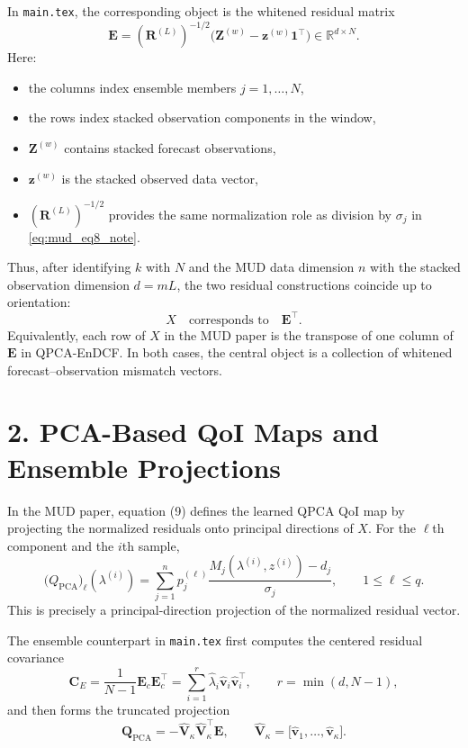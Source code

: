 \documentclass[11pt]{article}
\begin{document}
In \texttt{main.tex}, the corresponding object is the whitened residual matrix
\begin{equation}
\mathbf{E}
=
(\mathbf{R}^{(L)})^{-1/2}\bigl(\mathbf{Z}^{(w)} - \mathbf{z}^{(w)}\mathbf{1}^\top\bigr)
\in \mathbb{R}^{d \times N}.
\label{eq:endcf_residual_note}
\end{equation}
Here:
\begin{itemize}
\item the columns index ensemble members $j=1,\dots,N$,
\item the rows index stacked observation components in the window,
\item $\mathbf{Z}^{(w)}$ contains stacked forecast observations,
\item $\mathbf{z}^{(w)}$ is the stacked observed data vector,
\item $(\mathbf{R}^{(L)})^{-1/2}$ provides the same normalization role as division by $\sigma_j$ in \eqref{eq:mud_eq8_note}.
\end{itemize}

Thus, after identifying $k$ with $N$ and the MUD data dimension $n$ with the stacked observation dimension $d=mL$, the two residual constructions coincide up to orientation:
\begin{equation}
X \quad \text{corresponds to} \quad \mathbf{E}^\top.
\end{equation}
Equivalently, each row of $X$ in the MUD paper is the transpose of one column of $\mathbf{E}$ in QPCA-EnDCF. In both cases, the central object is a collection of whitened forecast--observation mismatch vectors.

\section*{2. PCA-Based QoI Maps and Ensemble Projections}

In the MUD paper, equation (9) defines the learned QPCA QoI map by projecting the normalized residuals onto principal directions of $X$. For the $\ell$th component and the $i$th sample,
\begin{equation}
\bigl(Q_{\mathrm{PCA}}\bigr)_\ell(\lambda^{(i)})
=
\sum_{j=1}^n p_j^{(\ell)}
\frac{M_j(\lambda^{(i)}, z^{(i)}) - d_j}{\sigma_j},
\qquad 1 \le \ell \le q.
\label{eq:mud_eq9_note}
\end{equation}
This is precisely a principal-direction projection of the normalized residual vector.

The ensemble counterpart in \texttt{main.tex} first computes the centered residual covariance
\begin{equation}
\mathbf{C}_E
=
\frac{1}{N-1}\mathbf{E}_c\mathbf{E}_c^\top
=
\sum_{i=1}^{r}\hat{\lambda}_i\hat{\mathbf{v}}_i\hat{\mathbf{v}}_i^\top,
\qquad r=\min(d,N-1),
\end{equation}
and then forms the truncated projection
\begin{equation}
\mathbf{Q}_{\mathrm{PCA}}
=
-\hat{\mathbf{V}}_\kappa \hat{\mathbf{V}}_\kappa^\top \mathbf{E},
\qquad
\hat{\mathbf{V}}_\kappa
=
\bigl[\hat{\mathbf{v}}_1,\dots,\hat{\mathbf{v}}_\kappa\bigr].
\label{eq:endcf_qpca_note}
\end{equation}
\end{document}
